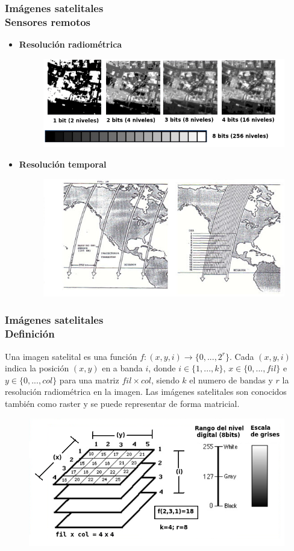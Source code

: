 \documentclass[xcolor=table]{beamer}
\begin{document}
		\begin{frame}
			\frametitle{Im\'agenes satelitales\\Sensores remotos}
			\begin{itemize}
				
				\item \textbf{Resoluci\'on radiom\'etrica}
				\begin{figure}[H]
					\centering
					\includegraphics[width=0.5	\textwidth]{imagenes/cap3/radiometrica_bits}
					\label{fig:radioRes}
				\end{figure}
				\item \textbf{Resoluci\'on temporal} 
				\begin{figure}[H]
					\centering
					\includegraphics[width=0.5	\textwidth]{imagenes/cap3/resolucion_temporal_land.png}
					\label{fig:temporaRes}
				\end{figure}
			\end{itemize}		
			
		\end{frame}
		
		\begin{frame}
			\frametitle{Im\'agenes satelitales\\Definici\'on}		
			Una imagen satelital es una funci\'on $ f:(x,y,i) \longrightarrow \{0,...,2^{r}\} $. Cada $ (x,y,i) $ indica la posici\'on $ (x,y) $ en a banda $ i $, donde $ i \in \{1,...,k\} $, $ x \in \{0,...,fil\} $ e $ y \in \{0,...,col\} $ para una matriz $ fil \times col $, siendo $ k $ el numero de bandas y $ r $ la resoluci\'on radiom\'etrica en la imagen. Las im\'agenes satelitales son conocidos tambi\'en como raster y se puede representar de forma matricial.
			\begin{figure}
				\centering
				\includegraphics[width=0.7	\textwidth]{imagenes/cap3/imagen_satelital_k4.png}
				\label{fig:imagenMultiespectral}
			\end{figure}
			
		\end{frame}
		
\end{document}
